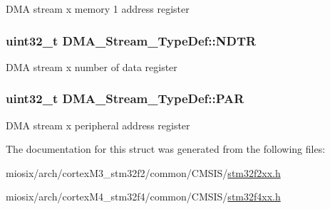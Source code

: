 D\-M\-A stream x memory 1 address register \hypertarget{struct_d_m_a___stream___type_def_a2cc2a52628182f9e79ab1e49bb78a1eb}{
\subsubsection[{N\-D\-T\-R}]{ uint32\-\_\-t D\-M\-A\-\_\-\-Stream\-\_\-\-Type\-Def\-::\-N\-D\-T\-R}}\label{struct_d_m_a___stream___type_def_a2cc2a52628182f9e79ab1e49bb78a1eb}
D\-M\-A stream x number of data register \hypertarget{struct_d_m_a___stream___type_def_adbeac1d47cb85ab52dac71d520273947}{
\subsubsection[{P\-A\-R}]{ uint32\-\_\-t D\-M\-A\-\_\-\-Stream\-\_\-\-Type\-Def\-::\-P\-A\-R}}\label{struct_d_m_a___stream___type_def_adbeac1d47cb85ab52dac71d520273947}
D\-M\-A stream x peripheral address register 

The documentation for this struct was generated from the following files\-:\begin{DoxyCompactItemize}
\item 
miosix/arch/cortex\-M3\-\_\-stm32f2/common/\-C\-M\-S\-I\-S/\hyperlink{stm32f2xx_8h}{stm32f2xx.\-h}\item 
miosix/arch/cortex\-M4\-\_\-stm32f4/common/\-C\-M\-S\-I\-S/\hyperlink{stm32f4xx_8h}{stm32f4xx.\-h}\end{DoxyCompactItemize}
